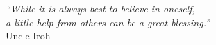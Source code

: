 \cleardoublepage
\thispagestyle{plain}

\vspace*{8cm}

\begin{flushright}
  \textsl{``While it is always best to believe in oneself, \\
  a little help from others can be a great blessing.''}\\
\vspace*{1.5cm}
    Uncle Iroh
\end{flushright}
